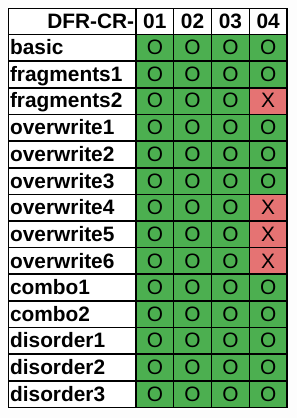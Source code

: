 \begin{figure}
\begin{subfigure}[b]{0.3\linewidth}
        \includegraphics[width=\linewidth]{fig/ftk_results_fat.pdf}
    \end{subfigure}~~
    \begin{subfigure}[b]{0.3\linewidth}

\end{subfigure}
\end{figure}
